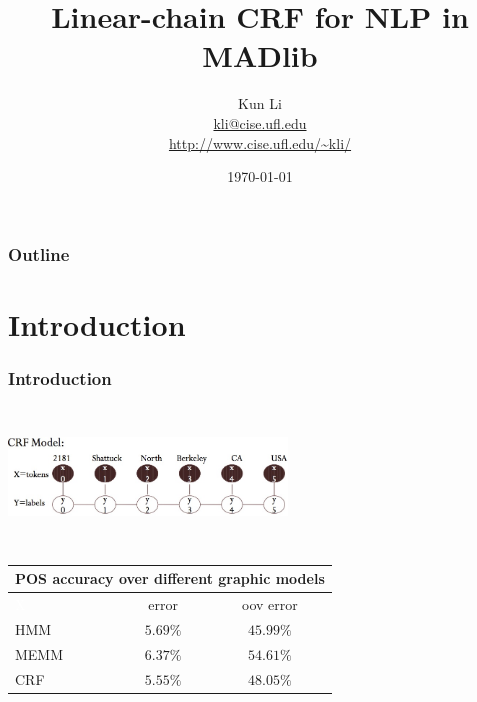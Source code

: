 \documentclass{beamer}
\title[Linear-chain CRF for NLP in MADlib]{
  Linear-chain CRF for NLP in MADlib}
\author[Kun Li]{
  Kun Li \\\medskip
  {\small \url{kli@cise.ufl.edu}} \\ 
  {\small \url{http://www.cise.ufl.edu/~kli/}}}
\institute[University of Florida]{
  Department of Computer \& Information Science \& Engineering\\
  University of Florida}
\date[Data Science Tea]{\today}
\begin{document}
\begin{frame}
  \titlepage
\end{frame}

\begin{frame}
  \frametitle{Outline}

  \tableofcontents
\end{frame}

\section{Introduction}

\begin{frame}
  \frametitle{Introduction}
  \begin{center}
  \includegraphics[height=10em, width=20em]{crf.jpg}\\
  \begin{tabular}{|l|c|c|}
  \multicolumn{3}{c}{\textbf{POS accuracy over different graphic models}} \\
  \hline
  \textcolor{white}{X} & error & oov error \\
  \hline
  HMM & $5.69\%$ & $45.99\%$ \\
  \hline
  MEMM & $6.37\%$ & $54.61\%$ \\
  \hline
  CRF & $5.55\%$ & $48.05\%$ \\
  \hline
  \hline
  \end{tabular}
  \label{tab:approaches}
  \end{center}
\end{frame}
\end{document}
